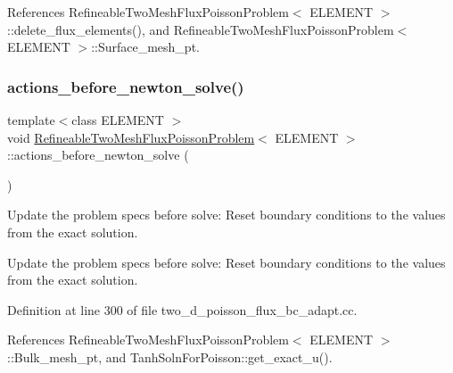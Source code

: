 References Refineable\+Two\+Mesh\+Flux\+Poisson\+Problem$<$ E\+L\+E\+M\+E\+N\+T $>$\+::delete\+\_\+flux\+\_\+elements(), and Refineable\+Two\+Mesh\+Flux\+Poisson\+Problem$<$ E\+L\+E\+M\+E\+N\+T $>$\+::\+Surface\+\_\+mesh\+\_\+pt.

\mbox{\label{classRefineableTwoMeshFluxPoissonProblem_a209506229c491a8cec4e1dce387e18c3}} 
\subsubsection{\texorpdfstring{actions\+\_\+before\+\_\+newton\+\_\+solve()}{actions\_before\_newton\_solve()}}
{\footnotesize\ttfamily template$<$class E\+L\+E\+M\+E\+NT $>$ \\
void \hyperlink{classRefineableTwoMeshFluxPoissonProblem}{Refineable\+Two\+Mesh\+Flux\+Poisson\+Problem}$<$ E\+L\+E\+M\+E\+NT $>$\+::actions\+\_\+before\+\_\+newton\+\_\+solve (\begin{DoxyParamCaption}{ }\end{DoxyParamCaption})\hspace{0.3cm}{\ttfamily [private]}}



Update the problem specs before solve\+: Reset boundary conditions to the values from the exact solution. 

Update the problem specs before solve\+: Reset boundary conditions to the values from the exact solution. 

Definition at line 300 of file two\+\_\+d\+\_\+poisson\+\_\+flux\+\_\+bc\+\_\+adapt.\+cc.



References Refineable\+Two\+Mesh\+Flux\+Poisson\+Problem$<$ E\+L\+E\+M\+E\+N\+T $>$\+::\+Bulk\+\_\+mesh\+\_\+pt, and Tanh\+Soln\+For\+Poisson\+::get\+\_\+exact\+\_\+u().

\mbox{\label{classRefineableTwoMeshFluxPoissonProblem_ac2eaf11cfc4dda41f97cacc2a1a1f86e}} 
